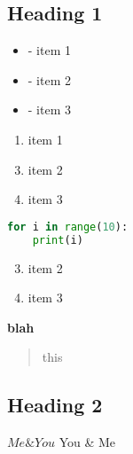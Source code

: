 \documentclass{article}
\begin{document}
 
\setcounter{secnumdepth}{0}

\subsection{Heading 1}

\begin{itemize}
    \item - item 1
    \item - item 2
    \item - item 3
\end{itemize}

\begin{enumerate}
    \setcounter{enumi}{0}
    \item item 1
\end{enumerate}

\begin{enumerate}
    \setcounter{enumi}{2}
    \item item 2
    \item item 3
\end{enumerate}

\begin{lstlisting}[language=python, style=myStyle]
for i in range(10):
    print(i)
\end{lstlisting}

\begin{enumerate}
    \setcounter{enumi}{2}
    \item item 2
    \item item 3
\end{enumerate}

\textbf{blah}
\begin{quote}
    this
\end{quote}

\subsection{Heading 2}

$Me \& You$
You \& Me
\end{document}
